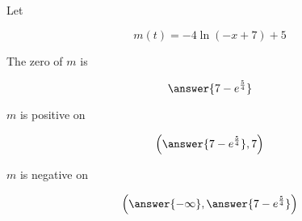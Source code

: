 \documentclass{ximera}
\author{Lee Wayand}
\begin{document}
\begin{exercise}





Let 


\[
m(t) = -4 \ln(-x+7)  + 5
\]





\begin{question}



The zero of $m$ is


\[
\answer{ 7 - e^{\frac{5}{4}} }
\]


\end{question}









\begin{question}



$m$ is positive on 


\[
\left( \answer{ 7 - e^{\frac{5}{4}} }, 7 \right)
\]


\end{question}








\begin{question}



$m$ is negative on 


\[
\left( \answer{-\infty}, \answer{ 7 - e^{\frac{5}{4}} }  \right)
\]


\end{question}









\end{exercise}
\end{document}
